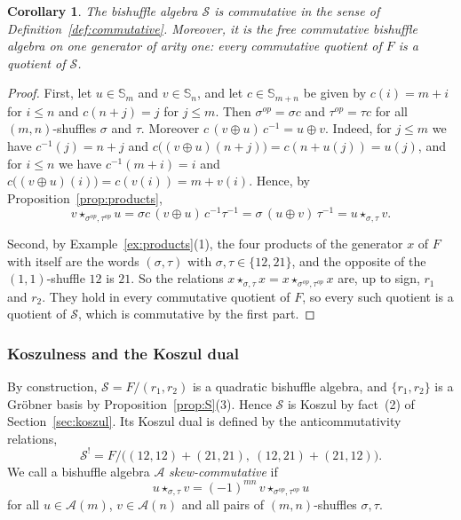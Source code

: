 \documentclass[11pt]{amsart}
\newtheorem{corollary}[theorem]{Corollary}
\theoremstyle{definition}
\theoremstyle{remark}
\newcommand{\bS}{\mathbb{S}}
\newcommand{\cA}{\mathscr{A}}
\newcommand{\cS}{\mathscr{S}}
\begin{document}
\begin{corollary}\label{cor:S-commutative}
The bishuffle algebra $\cS$ is commutative in the sense of Definition~\ref{def:commutative}. Moreover, it is the free commutative bishuffle algebra on one generator of arity one: every commutative quotient of $F$ is a quotient of $\cS$.
\end{corollary}

\begin{proof}
First, let $u\in\bS_m$ and $v\in\bS_n$, and let $c\in\bS_{m+n}$ be given by $c(i)=m+i$ for $i\le n$ and $c(n+j)=j$ for $j\le m$. Then $\sigma^{op}=\sigma c$ and $\tau^{op}=\tau c$ for all $(m,n)$-shuffles $\sigma$ and $\tau$. Moreover $c\,(v\oplus u)\,c^{-1}=u\oplus v$. Indeed, for $j\le m$ we have $c^{-1}(j)=n+j$ and $c\bigl((v\oplus u)(n+j)\bigr)=c(n+u(j))=u(j)$, and for $i\le n$ we have $c^{-1}(m+i)=i$ and $c\bigl((v\oplus u)(i)\bigr)=c(v(i))=m+v(i)$. Hence, by Proposition~\ref{prop:products},
\[
v\star_{\sigma^{op},\tau^{op}}u=\sigma c\,(v\oplus u)\,c^{-1}\tau^{-1}=\sigma\,(u\oplus v)\,\tau^{-1}=u\star_{\sigma,\tau}v .
\]

Second, by Example~\ref{ex:products}(1), the four products of the generator $x$ of $F$ with itself are the words $(\sigma,\tau)$ with $\sigma,\tau\in\{12,21\}$, and the opposite of the $(1,1)$-shuffle $12$ is $21$. So the relations $x\star_{\sigma,\tau}x=x\star_{\sigma^{op},\tau^{op}}x$ are, up to sign, $r_1$ and $r_2$. They hold in every commutative quotient of $F$, so every such quotient is a quotient of $\cS$, which is commutative by the first part.
\end{proof}

\subsubsection{Koszulness and the Koszul dual}
By construction, $\cS=F/(r_1,r_2)$ is a quadratic bishuffle algebra, and $\{r_1,r_2\}$ is a Gr\"obner basis by Proposition~\ref{prop:S}(3). Hence $\cS$ is Koszul by fact~(2) of Section~\ref{sec:koszul}. Its Koszul dual is defined by the anticommutativity relations,
\[
\cS^!=F\big/\bigl((12,12)+(21,21),\ (12,21)+(21,12)\bigr).
\]
We call a bishuffle algebra $\cA$ \emph{skew-commutative} if
\[
u\star_{\sigma,\tau}v=(-1)^{mn}\,v\star_{\sigma^{op},\tau^{op}}u
\]
for all $u\in\cA(m)$, $v\in\cA(n)$ and all pairs of $(m,n)$-shuffles $\sigma,\tau$.
\end{document}
